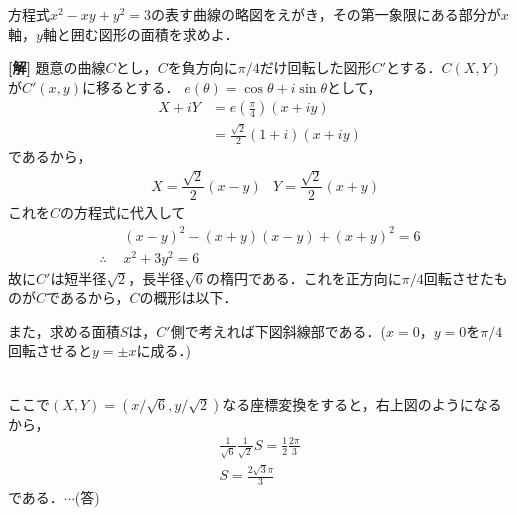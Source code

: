 \documentclass[a4j]{jarticle}
\begin{document}

     \begin{oframed}
     方程式$x^2-xy+y^2=3$の表す曲線の略図をえがき，その第一象限にある部分が$x$軸，$y$軸と囲む図形の面積を求めよ．
     \end{oframed}

\setlength{\columnseprule}{0.4pt}
\begin{multicols}{2}
{\bf[解]} 題意の曲線$C$とし，$C$を負方向に$\pi/4$だけ回転した図形$C'$とする．$C(X,Y)$が$C'(x,y)$に移るとする．
 $e(\theta)=\cos\theta+i\sin\theta$として，
      \begin{align*}
      X+iY&=e\left(\frac{\pi}{4}\right)(x+iy) \\
      &=\frac{\sqrt{2}}{2}(1+i)(x+iy) 
      \end{align*}
であるから，
     \begin{align*}
      &X=\dfrac{\sqrt{2}}{2}(x-y) &
      Y=\dfrac{\sqrt{2}}{2}(x+y)
      \end{align*}
これを$C$の方程式に代入して
     \begin{align*}
     &(x-y)^2-(x+y)(x-y)+(x+y)^2=6 \\
     \therefore \,\ &x^2+3y^2=6
     \end{align*}
故に$C'$は短半径$\sqrt{2}$，長半径$\sqrt{6}$の楕円である．これを正方向に$\pi/4$回転させたものが$C$であるから，$C$の概形は以下．
     \begin{center}
     \scalebox{.5}{}
     \end{center}           
また，求める面積$S$は，$C'$側で考えれば下図斜線部である．($x=0$，$y=0$を$\pi/4$回転させると$y=\pm x$に成る．) \\ 

     \begin{minipage}{0.5\hsize}
          \begin{center}
          \scalebox{.5}{}
          \end{center}
     \end{minipage}
     \begin{minipage}{0.5\hsize}
          \begin{center}
          \scalebox{.5}{}
          \end{center}
 \end{minipage} \\
 
ここで$(X,Y)=(x/\sqrt{6},y/\sqrt{2})$なる座標変換をすると，右上図のようになるから，
     \begin{align*}
     \frac{1}{\sqrt{6}}\frac{1}{\sqrt{2}}S=\frac{1}{2}\frac{2\pi}{3} \\
     S=\frac{2\sqrt{3}\pi}{3}
     \end{align*}
である．$\cdots$(答)
           


\newpage
\end{multicols}
\end{document}
